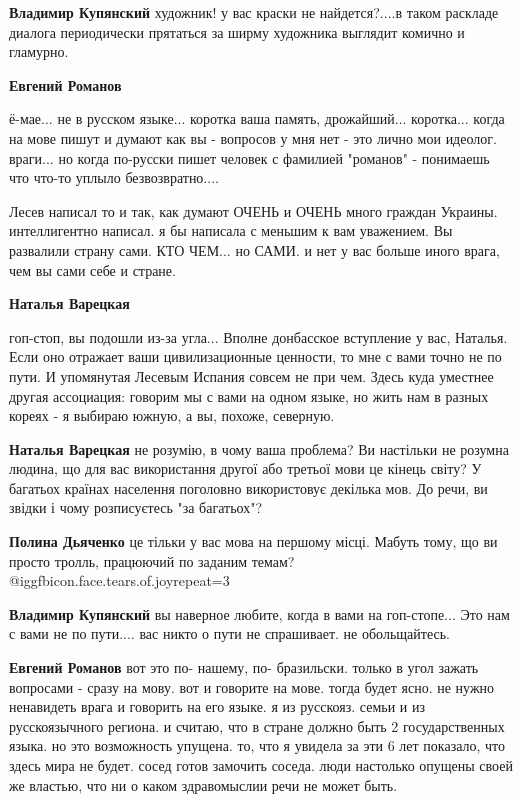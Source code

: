\begin{itemize}
\begin{itemize}
\textbf{Владимир Купянский} художник! у вас краски не найдется?....в таком раскладе диалога периодически прятаться за ширму художника выглядит комично и гламурно.

\textbf{Евгений Романов} 

ё-мае... не в русском языке... коротка ваша память, дрожайший... коротка...
когда на мове пишут и думают как вы - вопросов у мня нет - это лично мои
идеолог. враги... но когда по-русски пишет человек с фамилией "романов" -
понимаешь что что-то уплыло безвозвратно....

Лесев написал то и так, как думают ОЧЕНЬ и ОЧЕНЬ много граждан Украины.
интеллигентно написал. я бы написала с меньшим к вам уважением. Вы развалили
страну сами. КТО ЧЕМ... но САМИ. и нет у вас больше иного врага, чем вы сами
себе и стране.


\textbf{Наталья Варецкая} 

гоп-стоп, вы подошли из-за угла... Вполне донбасское вступление у вас, Наталья.
Если оно отражает ваши цивилизационные ценности, то мне с вами точно не по
пути. И упомянутая Лесевым Испания совсем не при чем. Здесь куда уместнее
другая ассоциация: говорим мы с вами на одном языке, но жить нам в разных
кореях - я выбираю южную, а вы, похоже, северную.

\textbf{Наталья Варецкая} не розумію, в чому ваша проблема? Ви настільки не розумна людина, що для вас використання другої або третьої мови це кінець світу? У багатьох країнах населення поголовно використовує декілька мов. До речи, ви звідки і чому розписуєтесь "за багатьох"?

\textbf{Полина Дьяченко} це тільки у вас мова на першому місці. Мабуть тому, що ви просто тролль, працюючий по заданим темам?  @igg{fbicon.face.tears.of.joy}{repeat=3} 

\textbf{Владимир Купянский} вы наверное любите, когда в вами на гоп-стопе...
Это нам с вами не по пути.... вас никто о пути не спрашивает. не обольщайтесь.

\textbf{Евгений Романов} вот это по- нашему, по- бразильски. только в угол зажать вопросами - сразу на мову.
вот и говорите на мове. тогда будет ясно. не нужно ненавидеть врага и говорить на его языке.
я из русскояз. семьи и из русскоязычного региона. и считаю, что в стране должно быть 2 государственных языка.
но это возможность упущена. то, что я увидела за эти 6 лет показало, что здесь мира не будет. сосед готов замочить соседа. люди настолько опущены своей же властью, что ни о каком здравомыслии речи не может быть.


\end{itemize}
\end{itemize}
